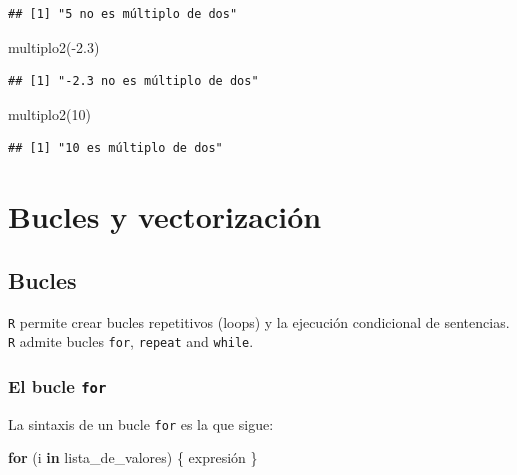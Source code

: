 \documentclass[
]{book}
\newenvironment{Shaded}{\begin{snugshade}}{\end{snugshade}}
\newcommand{\ControlFlowTok}[1]{\textcolor[rgb]{0.13,0.29,0.53}{\textbf{#1}}}
\newcommand{\DecValTok}[1]{\textcolor[rgb]{0.00,0.00,0.81}{#1}}
\newcommand{\FloatTok}[1]{\textcolor[rgb]{0.00,0.00,0.81}{#1}}
\newcommand{\FunctionTok}[1]{\textcolor[rgb]{0.00,0.00,0.00}{#1}}
\newcommand{\NormalTok}[1]{#1}
\newcommand{\SpecialCharTok}[1]{\textcolor[rgb]{0.00,0.00,0.00}{#1}}
\theoremstyle{break}
\theoremstyle{nonumberplain}
\begin{document}
\begin{verbatim}
## [1] "5 no es múltiplo de dos"
\end{verbatim}

\begin{Shaded}
\begin{Highlighting}[]
\FunctionTok{multiplo2}\NormalTok{(}\SpecialCharTok{{-}}\FloatTok{2.3}\NormalTok{)}
\end{Highlighting}
\end{Shaded}

\begin{verbatim}
## [1] "-2.3 no es múltiplo de dos"
\end{verbatim}

\begin{Shaded}
\begin{Highlighting}[]
\FunctionTok{multiplo2}\NormalTok{(}\DecValTok{10}\NormalTok{)}
\end{Highlighting}
\end{Shaded}

\begin{verbatim}
## [1] "10 es múltiplo de dos"
\end{verbatim}

\hypertarget{bucles-y-vectorizaciuxf3n}{%
\section{Bucles y vectorización}\label{bucles-y-vectorizaciuxf3n}}

\hypertarget{bucles}{%
\subsection{Bucles}\label{bucles}}

\texttt{R} permite crear bucles repetitivos
(loops) y la ejecución condicional de sentencias. \texttt{R} admite bucles
\texttt{for}, \texttt{repeat} and \texttt{while}.

\hypertarget{el-bucle-for}{%
\subsubsection{\texorpdfstring{El bucle \texttt{for}}{El bucle for}}\label{el-bucle-for}}

La sintaxis de un bucle \texttt{for} es la que sigue:

\begin{Shaded}
\begin{Highlighting}[]
\ControlFlowTok{for}\NormalTok{ (i }\ControlFlowTok{in}\NormalTok{ lista\_de\_valores)  \{ expresión \}}
\end{Highlighting}
\end{Shaded}
\end{document}
